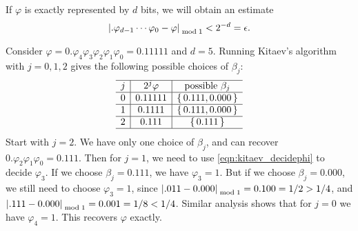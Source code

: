 If $\varphi$ is exactly represented by $d$ bits, we will obtain an estimate
\begin{equation}\label{eqn:phi_kitaev_estimate}
\left\lvert.\varphi_{d-1}\cdots \varphi_0-\varphi\right\rvert_{\bmod 1}<2^{-d}=\epsilon.
\end{equation} 


% 
% 
% 


\begin{exam}
Consider $\varphi=0.\varphi_4\varphi_3\varphi_2\varphi_1\varphi_0=0.11111$ and $d=5$. Running Kitaev's algorithm with $j=0,1,2$ gives the following possible choices of $\beta_j$:
\[
\begin{array}{c|c|c}\hline
j & 2^j \varphi & \mbox{possible }\beta_j \\\hline
0 & 0.11111 & \set{0.111,0.000} \\\hline
1 & 0.1111 & \set{0.111,0.000} \\\hline
2 & 0.111 & \set{0.111} \\\hline
\end{array}
\]
Start with $j=2$. We have only one choice of $\beta_j$, and can recover $0.\varphi_2\varphi_1\varphi_0=0.111$. Then for $j=1$,  we need to use \cref{eqn:kitaev_decidephi} to decide $\varphi_3$. If we choose $\beta_j=0.111$, we have $\varphi_3=1$. But if we choose $\beta_j=0.000$, we still need to choose $\varphi_3=1$, since 
$\left\lvert.011-0.000\right\rvert_{\bmod 1}=0.100=1/2>1/4$, and $\left\lvert.111-0.000\right\rvert_{\bmod 1}=0.001=1/8<1/4$. 
Similar analysis shows that for $j=0$ we have $\varphi_4=1$. This recovers $\varphi$ exactly.
\end{exam}

